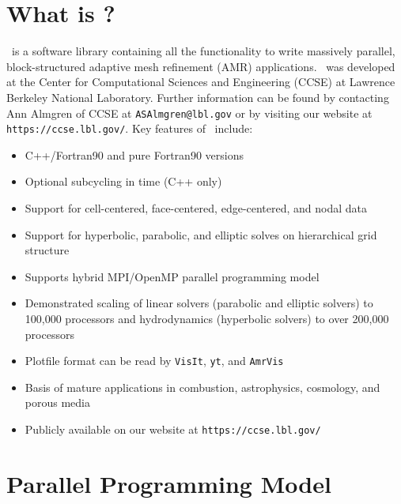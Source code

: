 \section{What is \BoxLib?}

\BoxLib\ is a software library containing all the functionality to write massively parallel, 
block-structured adaptive mesh refinement (AMR) applications.
\BoxLib\ was developed at the Center for Computational Sciences and Engineering (CCSE) at 
Lawrence Berkeley National Laboratory.  Further information can be found by contacting 
Ann Almgren of CCSE at {\tt ASAlmgren@lbl.gov} or by visiting our website
at {\tt https://ccse.lbl.gov/}.  Key features of \BoxLib\ include:

\begin{itemize}
\item C++/Fortran90 and pure Fortran90 versions
\item Optional subcycling in time (C++ only)
\item Support for cell-centered, face-centered, edge-centered, and nodal data
\item Support for hyperbolic, parabolic, and elliptic solves on hierarchical grid structure
\item Supports hybrid MPI/OpenMP parallel programming model
\item Demonstrated scaling of linear solvers (parabolic and elliptic solvers) to 100,000 processors and 
      hydrodynamics (hyperbolic solvers) to over 200,000 processors
\item Plotfile format can be read by {\tt VisIt}, {\tt yt}, and {\tt AmrVis}
\item Basis of mature applications in combustion, astrophysics, cosmology, and porous media
\item Publicly available on our website at {\tt https://ccse.lbl.gov/}
\end{itemize}

\section{Parallel Programming Model}

